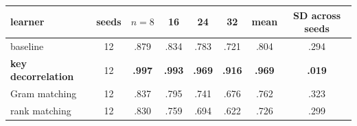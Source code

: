 \begin{tabular}{lccccccc}
\toprule
learner & seeds & $n{=}8$ & 16 & 24 & 32 & mean & SD across seeds \\
\midrule
baseline & 12 & .879 & .834 & .783 & .721 & .804 & .294 \\
\textbf{key decorrelation} & 12 & \textbf{.997} & \textbf{.993} & \textbf{.969} & \textbf{.916} & \textbf{.969} & \textbf{.019} \\
Gram matching & 12 & .837 & .795 & .741 & .676 & .762 & .323 \\
rank matching & 12 & .830 & .759 & .694 & .622 & .726 & .299 \\
\bottomrule
\end{tabular}
